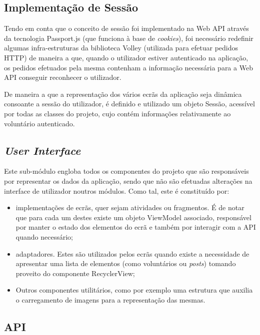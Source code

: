 \subsection{Implementação de Sessão}

Tendo em conta que o conceito de sessão foi implementado na Web API através da tecnologia Passport.js (que funciona à base de \textit{cookies}), foi necessário redefinir algumas infra-estruturas da biblioteca Volley (utilizada para efetuar pedidos HTTP) de maneira a que, quando o utilizador estiver autenticado na aplicação, os pedidos efetuados pela mesma contenham a informação necessária para a Web API conseguir reconhecer o utilizador.

\medskip

De maneira a que a representação dos vários ecrãs da aplicação seja dinâmica consoante a sessão do utilizador, é definido e utilizado um objeto Sessão, acessível por todas as classes do projeto, cujo contém informações relativamente ao voluntário autenticado.

\subsection{\textit{User Interface}}

Este sub-módulo engloba todos os componentes do projeto que são responsáveis por representar os dados da aplicação, sendo que não são efetuadas alterações na interface de utilizador noutros módulos. Como tal, este é constituído por:

\begin{itemize}
	\item implementações de ecrãs, quer sejam atividades ou fragmentos. É de notar que para cada um destes existe um objeto ViewModel associado, responsável por manter o estado dos elementos do ecrã e também por interagir com a API quando necessário; 
	\item adaptadores. Estes são utilizados pelos ecrãs quando existe a necessidade de apresentar uma lista de elementos (como voluntários ou \textit{posts}) tomando proveito do componente RecyclerView;
	\item Outros componentes utilitários, como por exemplo uma estrutura que auxilia o carregamento de imagens para a representação das mesmas.
\end{itemize} 

\subsection{API}

